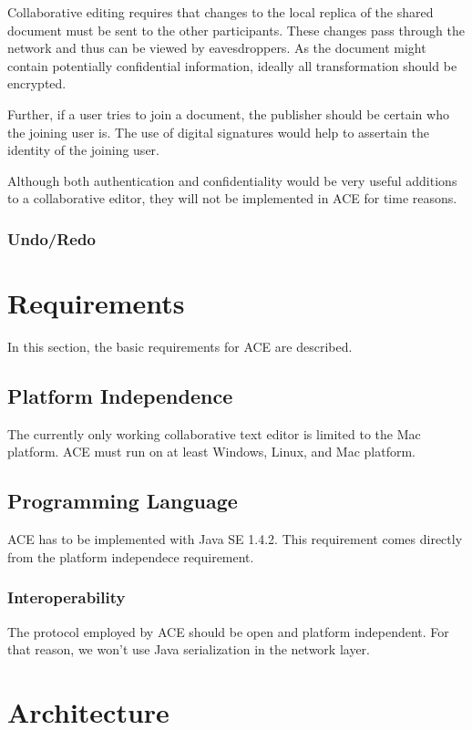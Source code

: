 \documentclass[11pt,a4paper]{article}
\begin{document}
Collaborative editing requires that changes to the local replica of the shared document must be sent to the other
participants. These changes pass through the network and thus can be viewed by eavesdroppers. As the document
might contain potentially confidential information, ideally all transformation should be encrypted.

Further, if a user tries to join a document, the publisher should be certain who the joining user is. The use
of digital signatures would help to assertain the identity of the joining user.

Although both authentication and confidentiality would be very useful additions to a collaborative editor, they
will not be implemented in ACE for time reasons.

\subsubsection{Undo/Redo}


\section{Requirements}

In this section, the basic requirements for ACE are described.

\subsection{Platform Independence}

The currently only working collaborative text editor is limited to the Mac platform. ACE must run on at least Windows,
Linux, and Mac platform.

\subsection{Programming Language}

ACE has to be implemented with Java SE 1.4.2. This requirement comes directly from the platform independece requirement.

\subsubsection{Interoperability}

The protocol employed by ACE should be open and platform independent. For that reason, we won't use Java serialization
in the network layer.


\section{Architecture}
\end{document}
